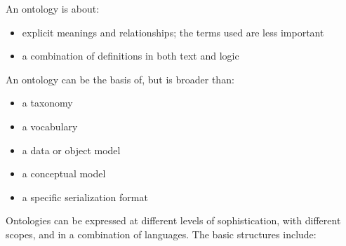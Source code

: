 %
%

\ekgmmCapabilitySectionContributionToEnterprise

An ontology is about:

\begin{itemize}
    \item explicit meanings and relationships; the terms used are less important
    \item a combination of definitions in both text and logic
\end{itemize}

An ontology can be the basis of, but is broader than:
\begin{itemize}
    \item a taxonomy
    \item a vocabulary
    \item a data or object model
    \item a conceptual model
    \item a specific serialization format
\end{itemize}

Ontologies can be expressed at different levels of sophistication, with different scopes,
and in a combination of languages.
The basic structures include:

